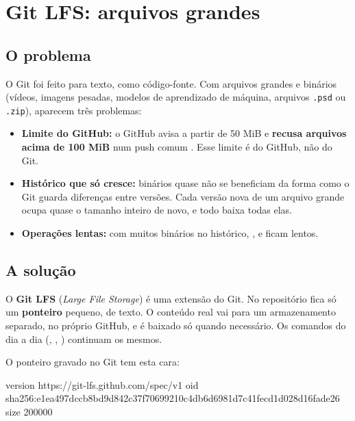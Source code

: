 \chapter{Git LFS: arquivos grandes}
\label{cap:lfs}

\section{O problema}

O Git foi feito para texto, como código-fonte. Com arquivos grandes e binários
(vídeos, imagens pesadas, modelos de aprendizado de máquina, arquivos
\texttt{.psd} ou \texttt{.zip}), aparecem três problemas:

\begin{itemize}
  \item \textbf{Limite do GitHub:} o GitHub avisa a partir de 50 MiB e
        \textbf{recusa arquivos acima de 100 MiB} num push comum
        \cite{github_lfs}. Esse limite é do GitHub, não do Git.
  \item \textbf{Histórico que só cresce:} binários quase não se beneficiam da
        forma como o Git guarda diferenças entre versões. Cada versão nova de
        um arquivo grande ocupa quase o tamanho inteiro de novo, e todo
         baixa todas elas.
  \item \textbf{Operações lentas:} com muitos binários no histórico,
        ,  e  ficam lentos.
\end{itemize}

\section{A solução}

\begin{conceito}
O \textbf{Git LFS} (\emph{Large File Storage}) é uma extensão do Git. No
repositório fica só um \textbf{ponteiro} pequeno, de texto. O conteúdo real vai
para um armazenamento separado, no próprio GitHub, e é baixado só quando
necessário. Os comandos do dia a dia (, ,
) continuam os mesmos.
\end{conceito}

O ponteiro gravado no Git tem esta cara:

\begin{saida}
version https://git-lfs.github.com/spec/v1
oid sha256:e1ea497dccb8bd9d842c37f70699210c4db6d6981d7c41fecd1d028d16fade26
size 200000
\end{saida}

